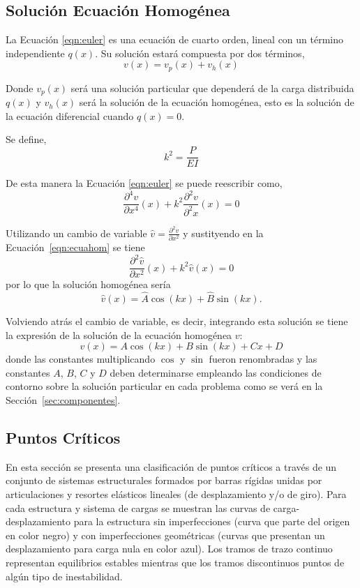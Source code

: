 \subsection{Solución Ecuación Homogénea}

La Ecuación \eqref{eqn:euler} es una ecuación de cuarto orden, lineal con un término independiente $q(x)$. Su solución estará compuesta por dos términos,
\begin{equation}
v(x)= v_p(x) + v_h(x)
\end{equation}

Donde $v_p(x)$ será una solución particular que dependerá de la carga distribuida $q(x)$ y $v_h(x)$ será la solución de la ecuación homogénea, esto es la solución de la ecuación diferencial cuando $q(x)=0$.

Se define,
\begin{equation}\label{eqn:defk}
k^2=\frac{P}{EI}
\end{equation}

De esta manera la Ecuación \eqref{eqn:euler} se puede reescribir como,
\begin{equation}\label{eqn:ecuahom}
\frac{\partial^4 v}{\partial x^4}(x) + k^2 \frac{\partial^2 v}{\partial^2 x}(x) = 0
\end{equation}

Utilizando un cambio de variable $\hat{v}=\frac{\partial^2 v}{\partial x^2}$ y sustityendo en la Ecuación~\eqref{eqn:ecuahom} se tiene
$$
\frac{\partial^2 \hat{v}}{\partial x^2}(x) + k^2 \hat{v}(x) = 0
$$
por lo que la solución homogénea sería
$$
\hat{v}(x) = \hat{A} \cos (kx) + \hat{B} \sin (kx).
$$

Volviendo atrás el cambio de variable, es decir, integrando esta solución se tiene la expresión de la solución de la ecuación homogénea $v$:
%
\begin{equation}
v(x) = A \cos (kx) + B \sin (kx) + Cx + D
\end{equation}
%
donde las constantes multiplicando $\cos$ y $\sin$ fueron renombradas y las constantes $A$, $B$, $C$ y $D$ deben determinarse empleando las condiciones de contorno sobre la solución particular en cada problema como se verá en la Sección~\ref{sec:componentes}.


\subsection{Puntos Críticos}

En esta sección se presenta una clasificación de puntos críticos a través de un conjunto de sistemas estructurales formados por barras rígidas unidas por articulaciones y resortes elásticos lineales (de desplazamiento y/o de giro). Para cada estructura y sistema de cargas se muestran las curvas de carga-desplazamiento para la estructura sin imperfecciones (curva que parte del origen en color negro) y con imperfecciones geométricas (curvas que presentan un desplazamiento para carga nula en color azul). Los tramos de trazo continuo representan equilibrios estables mientras que los tramos discontinuos puntos de algún tipo de inestabilidad.

